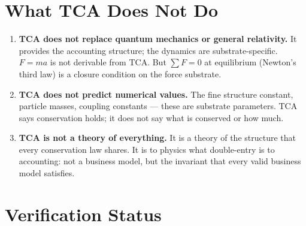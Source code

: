 \documentclass[11pt]{article}
\theoremstyle{definition}
\theoremstyle{remark}
\begin{document}
\section{What TCA Does Not Do}

\begin{enumerate}[leftmargin=2em]
\item \textbf{TCA does not replace quantum mechanics or general
  relativity.} It provides the accounting structure; the dynamics
  are substrate-specific. $F = ma$ is not derivable from TCA.
  But $\sum F = 0$ at equilibrium (Newton's third law) is a closure
  condition on the force substrate.

\item \textbf{TCA does not predict numerical values.} The fine
  structure constant, particle masses, coupling constants --- these
  are substrate parameters. TCA says conservation holds; it does
  not say what is conserved or how much.

\item \textbf{TCA is not a theory of everything.} It is a theory
  of the structure that every conservation law shares. It is to
  physics what double-entry is to accounting: not a business model,
  but the invariant that every valid business model satisfies.
\end{enumerate}

\section{Verification Status}
\end{document}
